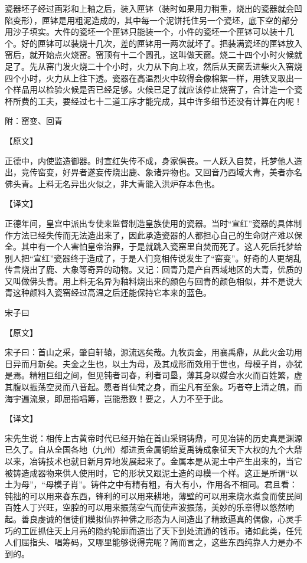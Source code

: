 \documentclass[12pt,UTF8]{ctexbook}
\begin{document}
瓷器坯子经过画彩和上釉之后，装入匣钵（装时如果用力稍重，烧出的瓷器就会凹陷变形），匣钵是用粗泥造成的，其中每一个泥饼托住另一个瓷坯，底下空的部分用沙子填实。大件的瓷坯一个匣钵只能装一个，小件的瓷坯一个匣钵可以装十几个。好的匣钵可以装烧十几次，差的匣钵用一两次就坏了。把装满瓷坯的匣钵放入窑后，就开始点火烧窑。窑顶有十二个圆孔，这叫做天窗。烧二十四个小时火候就足了。先从窑门发火烧二十个小时，火力从下向上攻，然后从天窗丢进柴火入窑烧四个小时，火力从上往下透。瓷器在高温烈火中软得会像棉絮一样，用铁叉取出一个样品用以检验火候是否已经足够。火候已足了就应该停止烧窑了，合计造一个瓷杯所费的工夫，要经过七十二道工序才能完成，其中许多细节还没有计算在内呢！

附：窑变、回青

【原文】

正德中，内使监造御器。时宣红失传不成，身家俱丧。一人跃入自焚，托梦他人造出，竞传窑变，好畀者遂妄传烧出鹿、象诸异物也。又回音乃西域大青，美者亦名佛头青。上料无名异出火似之，非大青能入洪炉存本色也。

【译文】

正德年间，皇宫中派出专使来监督制造皇族使用的瓷器。当时“宣红”瓷器的具体制作方法已经失传而无法造出来了，因此承造瓷器的人都担心自己的生命财产难以保全。其中有一个人害怕皇帝治罪，于是就跳入瓷窑里自焚而死了。这人死后托梦给别人把“宣红”瓷器终于造成了，于是人们竞相传说发生了“窑变”。好奇的人更胡乱传言烧出了鹿、大象等奇异的动物。又记：回青乃是产自西域地区的大青，优质的又叫做佛头青。用上料无名异为釉料烧出来的颜色与回青的颜色相似，并不是说大青这种颜料入瓷窑经过高温之后还能保持它本来的蓝色。

宋子曰

【原文】

宋子曰：首山之采，肇自轩辕，源流远矣哉。九牧贡金，用襄禹鼎，从此火金功用日异而月新矣。夫金之生也，以土为母，及其成形而效用于世也，母模子肖，亦犹是焉。精粗巨细之间，但见钝者司舂，利者司垦，薄其身以媒合水火而百姓繁，虚其腹以振荡空灵而八音起。愿者肖仙梵之身，而尘凡有至象。巧者夺上清之魄，而海宇遍流泉，即屈指唱筹，岂能悉数！要之，人力不至于此。

【译文】

宋先生说：相传上古黄帝时代已经开始在首山采铜铸鼎，可见冶铸的历史真是渊源已久了。自从全国各地（九州）都进贡金属铜给夏禹铸成象征天下大权的九个大鼎以来，冶铸技术也就日新月异地发展起来了。金属本是从泥土中产生出来的，当它被铸造成器物来供人使用时，它的形状又跟泥土造的母模一个样。这正是所谓“以土为母”，“母模子肖”。铸件之中有精有粗，有大有小，作用各不相同。君且看：钝拙的可以用来舂东西，锋利的可以用来耕地，薄壁的可以用来烧水煮食而使民间百姓人丁兴旺，空腔的可以用来振荡空气而使声波振荡，美妙的乐章得以悠然响起。善良虔诚的信徒们模拟仙界神佛之形态为人间造出了精致逼真的偶像，心灵手巧的工匠抓住天上月亮的隐约轮廓而造出了天下到处流通的钱币。诸如此类，任凭人们屈指头、唱筹码，又哪里能够说得完呢？简而言之，这些东西纯靠人力是办不到的。
\end{document}
